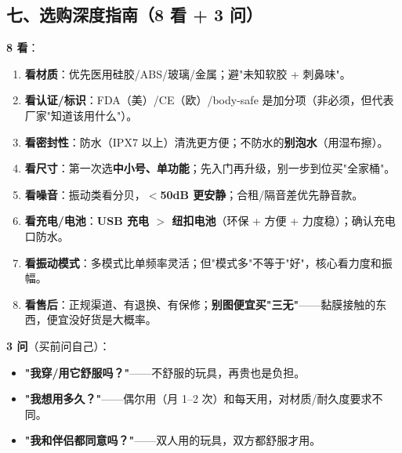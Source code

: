 \documentclass[12pt,UTF8,openany]{ctexbook}
\begin{document}
\subsection*{七、选购深度指南（8 看 + 3 问）}
\textbf{8 看}：
\begin{enumerate}[leftmargin=2em,itemsep=0.2em]
  \item \textbf{看材质}：优先医用硅胶/ABS/玻璃/金属；避"未知软胶 + 刺鼻味"。
  \item \textbf{看认证/标识}：FDA（美）/CE（欧）/body-safe 是加分项（非必须，但代表厂家"知道该用什么"）。
  \item \textbf{看密封性}：防水（IPX7 以上）清洗更方便；不防水的\textbf{别泡水}（用湿布擦）。
  \item \textbf{看尺寸}：第一次选\textbf{中小号、单功能}；先入门再升级，别一步到位买"全家桶"。
  \item \textbf{看噪音}：振动类看分贝，\textbf{$<$50dB 更安静}；合租/隔音差优先静音款。
  \item \textbf{看充电/电池}：\textbf{USB 充电 $>$ 纽扣电池}（环保 + 方便 + 力度稳）；确认充电口防水。
  \item \textbf{看振动模式}：多模式比单频率灵活；但"模式多"不等于"好"，核心看力度和振幅。
  \item \textbf{看售后}：正规渠道、有退换、有保修；\textbf{别图便宜买"三无"}——黏膜接触的东西，便宜没好货是大概率。
\end{enumerate}
\textbf{3 问}（买前问自己）：
\begin{itemize}[leftmargin=2em,itemsep=0.2em]
  \item \textbf{"我穿/用它舒服吗？"}——不舒服的玩具，再贵也是负担。
  \item \textbf{"我想用多久？"}——偶尔用（月 1--2 次）和每天用，对材质/耐久度要求不同。
  \item \textbf{"我和伴侣都同意吗？"}——双人用的玩具，双方都舒服才用。
\end{itemize}
\end{document}
